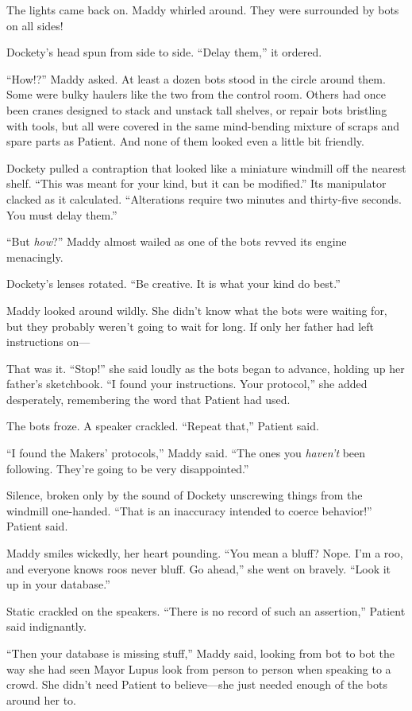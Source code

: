 \documentclass[10pt]{article}
\begin{document}
The lights came back on. Maddy whirled around. They were surrounded by
bots on all sides!

Dockety's head spun from side to side. ``Delay them,'' it ordered.

``How!?'' Maddy asked. At least a dozen bots stood in the circle around
them. Some were bulky haulers like the two from the control room. Others
had once been cranes designed to stack and unstack tall shelves, or
repair bots bristling with tools, but all were covered in the same
mind-bending mixture of scraps and spare parts as Patient. And none of
them looked even a little bit friendly.

Dockety pulled a contraption that looked like a miniature windmill off
the nearest shelf. ``This was meant for your kind, but it can be
modified.'' Its manipulator clacked as it calculated. ``Alterations
require two minutes and thirty-five seconds. You must delay them.''

``But \emph{how}?'' Maddy almost wailed as one of the bots revved its
engine menacingly.

Dockety's lenses rotated. ``Be creative. It is what your kind do best.''

Maddy looked around wildly. She didn't know what the bots were waiting
for, but they probably weren't going to wait for long. If only her
father had left instructions on---

That was it. ``Stop!'' she said loudly as the bots began to advance,
holding up her father's sketchbook. ``I found your instructions. Your
protocol,'' she added desperately, remembering the word that Patient had
used.

The bots froze. A speaker crackled. ``Repeat that,'' Patient said.

``I found the Makers' protocols,'' Maddy said. ``The ones you
\emph{haven't} been following. They're going to be very disappointed.''

Silence, broken only by the sound of Dockety unscrewing things from the
windmill one-handed. ``That is an inaccuracy intended to coerce
behavior!'' Patient said.

Maddy smiles wickedly, her heart pounding. ``You mean a bluff? Nope. I'm
a roo, and everyone knows roos never bluff. Go ahead,'' she went on
bravely. ``Look it up in your database.''

Static crackled on the speakers. ``There is no record of such an
assertion,'' Patient said indignantly.

``Then your database is missing stuff,'' Maddy said, looking from bot to
bot the way she had seen Mayor Lupus look from person to person when
speaking to a crowd. She didn't need Patient to believe---she just
needed enough of the bots around her to.
\end{document}
